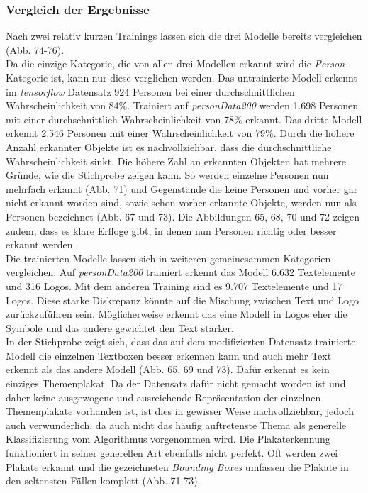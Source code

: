 \documentclass[a4paper,12pt,ngerman]{article}
\begin{document}
\subsubsection{Vergleich der Ergebnisse}

Nach zwei relativ kurzen Trainings lassen sich die drei Modelle bereits vergleichen (Abb. 74-76). \\
Da die einzige Kategorie, die von allen drei Modellen erkannt wird die \textit{Person}-Kategorie ist, kann nur diese verglichen werden. Das untrainierte Modell erkennt im \textit{tensorflow} Datensatz 924 Personen bei einer durchschnittlichen Wahrscheinlichkeit von 84\%. Trainiert auf \textit{personData200} werden 1.698 Personen mit einer durchschnittlich Wahrscheinlichkeit von 78\% erkannt. Das dritte Modell erkennt 2.546 Personen mit einer Wahrscheinlichkeit von 79\%. Durch die höhere Anzahl erkannter Objekte ist es nachvollziehbar, dass die durchschnittliche Wahrscheinlichkeit sinkt. Die höhere Zahl an erkannten Objekten hat mehrere Gründe, wie die Stichprobe zeigen kann. So werden einzelne Personen nun mehrfach erkannt (Abb. 71) und Gegenstände die keine Personen und vorher gar nicht erkannt worden sind, sowie schon vorher erkannte Objekte, werden nun als Personen bezeichnet (Abb. 67 und 73). Die Abbildungen 65, 68, 70 und 72 zeigen zudem, dass es klare Erfloge gibt, in denen nun Personen richtig oder besser erkannt werden. \\
Die trainierten Modelle lassen sich in weiteren gemeinesammen Kategorien vergleichen. Auf \textit{personData200} trainiert erkennt das Modell 6.632 Textelemente und 316 Logos. Mit dem anderen Training sind es 9.707 Textelemente und 17 Logos. Diese starke Diskrepanz könnte auf die Mischung zwischen Text und Logo zurückzuführen sein. Möglicherweise erkennt das eine Modell in Logos eher die Symbole und das andere gewichtet den Text stärker. \\
In der Stichprobe zeigt sich, dass das auf dem modifizierten Datensatz trainierte Modell die einzelnen Textboxen besser erkennen kann und auch mehr Text erkennt als das andere Modell (Abb. 65, 69 und 73). Dafür erkennt es kein einziges Themenplakat. Da der Datensatz dafür nicht gemacht worden ist und daher keine ausgewogene und ausreichende Repräsentation der einzelnen Themenplakate vorhanden ist, ist dies in gewisser Weise nachvollziehbar, jedoch auch verwunderlich, da auch nicht das häufig auftretenste Thema als generelle Klassifizierung vom Algorithmus vorgenommen wird. Die Plakaterkennung funktioniert in seiner generellen Art ebenfalls nicht perfekt. Oft werden zwei Plakate erkannt und die gezeichneten \textit{Bounding Boxes} umfassen die Plakate in den seltensten Fällen komplett (Abb. 71-73). \\
\end{document}
